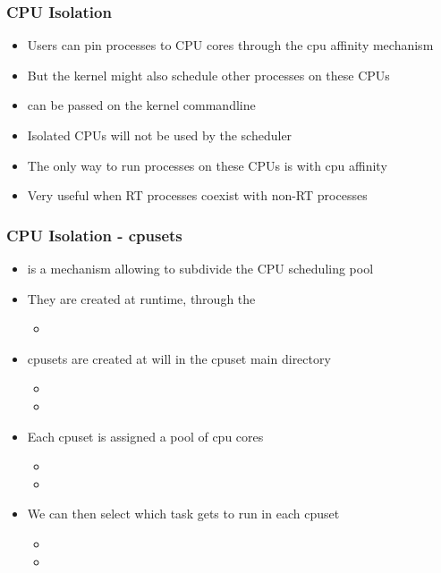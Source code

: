 \begin{frame}
	\frametitle{CPU Isolation}
	\begin{itemize}
		\item Users can pin processes to CPU cores through the cpu affinity mechanism
		\item But the kernel might also schedule other processes on these CPUs
		\item {} can be passed on the kernel commandline
		\item Isolated CPUs will not be used by the scheduler
		\item The only way to run processes on these CPUs is with cpu affinity
		\item Very useful when RT processes coexist with non-RT processes
	\end{itemize}
\end{frame}

\begin{frame}
	\frametitle{CPU Isolation - cpusets}
	\begin{itemize}
		\item {} is a mechanism allowing to subdivide the CPU scheduling pool
		\item They are created at runtime, through the 
			\begin{itemize}
				\item {}
			\end{itemize}
		\item cpusets are created at will in the cpuset main directory
			\begin{itemize}
				\item {}
				\item {}
			\end{itemize}
		\item Each cpuset is assigned a pool of cpu cores
			\begin{itemize}
				\item {}
				\item {}
			\end{itemize}
		\item We can then select which task gets to run in each cpuset
			\begin{itemize}
				\item {}
				\item {}
			\end{itemize}
	\end{itemize}
\end{frame}

